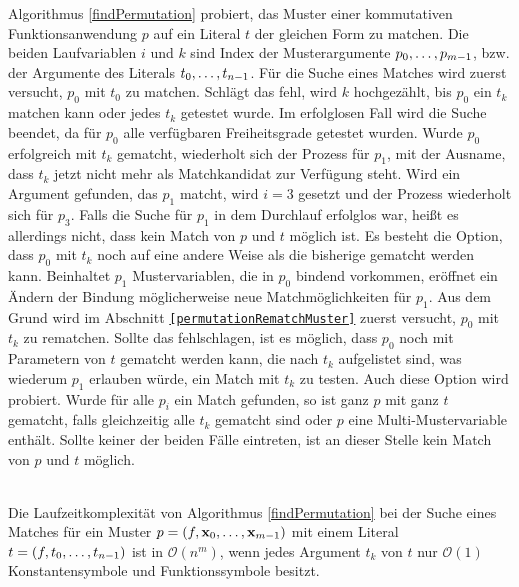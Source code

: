 Algorithmus \ref{findPermutation} probiert, das Muster einer kommutativen Funktionsanwendung $p$ auf ein Literal $t$ der gleichen Form zu matchen. Die beiden Laufvariablen $i$ und $k$ sind Index der Musterargumente ${p}_{0}, \dots, {p}_{m-1}$, bzw. der Argumente des Literals ${t}_{0}, \dots, {t}_{n-1}$. Für die Suche eines Matches wird zuerst versucht, $p_0$ mit $t_0$ zu matchen. Schlägt das fehl, wird $k$ hochgezählt, bis $p_0$ ein $t_k$ matchen kann oder jedes $t_k$ getestet wurde. Im erfolglosen Fall wird die Suche beendet, da für $p_0$ alle verfügbaren Freiheitsgrade getestet wurden. Wurde $p_0$ erfolgreich mit $t_k$ gematcht, wiederholt sich der Prozess für $p_1$, mit der Ausname, dass $t_k$ jetzt nicht mehr als Matchkandidat zur Verfügung steht. Wird ein Argument gefunden, das $p_1$ matcht, wird $i = 3$ gesetzt und der Prozess wiederholt sich für $p_3$. Falls die Suche für $p_1$ in dem Durchlauf erfolglos war, heißt es allerdings nicht, dass kein Match von $p$ und $t$ möglich ist. Es besteht die Option, dass $p_0$ mit $t_k$ noch auf eine andere Weise als die bisherige gematcht werden kann. Beinhaltet $p_1$ Mustervariablen, die in $p_0$ bindend vorkommen, eröffnet ein Ändern der Bindung möglicherweise neue Matchmöglichkeiten für $p_1$. Aus dem Grund wird im Abschnitt \texttt{\ref{permutationRematchMuster}} zuerst versucht, $p_0$ mit $t_k$ zu rematchen. Sollte das fehlschlagen, ist es möglich, dass $p_0$ noch mit Parametern von $t$ gematcht werden kann, die nach $t_k$ aufgelistet sind, was wiederum $p_1$ erlauben würde, ein Match mit $t_k$ zu testen. Auch diese Option wird probiert.
Wurde für alle $p_i$ ein Match gefunden, so ist ganz $p$ mit ganz $t$ gematcht, falls gleichzeitig alle $t_k$ gematcht sind oder $p$ eine Multi-Mustervariable enthält. Sollte keiner der beiden Fälle eintreten, ist an dieser Stelle kein Match von $p$ und $t$ möglich. 


\begin{lemma}\label{lemKomplexitaetFindPermutation}~\\
Die Laufzeitkomplexität von Algorithmus \ref{findPermutation} bei der Suche eines Matches für ein Muster $p = (f, {\mathbf x}_{0}, \dots, {\mathbf x}_{m-1})$ mit einem Literal $t = (f, {t}_{0}, \dots, {t}_{n-1})$ ist in $\mathcal O(n^m)$, wenn jedes Argument $t_k$ von $t$ nur $\mathcal O(1)$ Konstantensymbole und Funktionssymbole besitzt.
\end{lemma}

